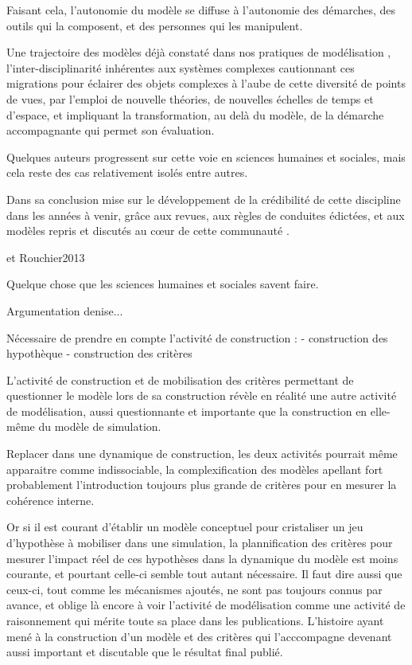 Faisant cela, l'autonomie du modèle se diffuse à l'autonomie des démarches, des outils qui la composent, et des personnes qui les manipulent.

Une trajectoire des modèles déjà constaté dans nos pratiques de modélisation \autocite{Banos2013}, l'inter-disciplinarité inhérentes aux systèmes complexes cautionnant ces migrations pour éclairer des objets complexes à l'aube de cette diversité de points de vues, par l'emploi de nouvelle théories, de nouvelles échelles de temps et d'espace, et impliquant la transformation, au delà du modèle, de la démarche accompagnante qui permet son évaluation.

Quelques auteurs progressent sur cette voie en sciences humaines et sociales, mais cela reste des cas relativement isolés \autocite{Ngo2012} \autocite{Schmitt2014} \autocite{Heppenstall2007} \autocite{Stonedahl2011a} entre autres.

Dans sa conclusion \autocite{Rouchier2013} mise sur le développement de la crédibilité de cette discipline dans les années à venir, grâce aux revues, aux règles de conduites édictées, et aux modèles repris et discutés au cœur de cette communauté \autocite{Hales2003}.



et Rouchier2013


Quelque chose que les sciences humaines et sociales savent faire.

Argumentation denise...


Nécessaire de prendre en compte l'activité de construction :
- construction des hypothèque 
- construction des critères


L'activité de construction et de mobilisation des critères permettant de questionner le modèle lors de sa construction révèle en réalité une autre activité de modélisation, aussi questionnante et importante que la construction en elle-même du modèle de simulation. 

Replacer dans une dynamique de construction, les deux activités pourrait même apparaitre comme indissociable, la complexification des modèles apellant fort probablement l'introduction toujours plus grande de critères pour en mesurer la cohérence interne.

Or si il est courant d'établir un modèle conceptuel pour cristaliser un jeu d'hypothèse à mobiliser dans une simulation, la plannification des critères pour mesurer l'impact réel de ces hypothèses dans la dynamique du modèle est moins courante, et pourtant celle-ci semble tout autant nécessaire. Il faut dire aussi que ceux-ci, tout comme les mécanismes ajoutés, ne sont pas toujours connus par avance, et oblige là encore à voir l'activité de modélisation comme une activité de raisonnement qui mérite toute sa place dans les publications. L'histoire ayant mené à la construction d'un modèle et des critères qui l'acccompagne devenant aussi important et discutable que le résultat final publié.



